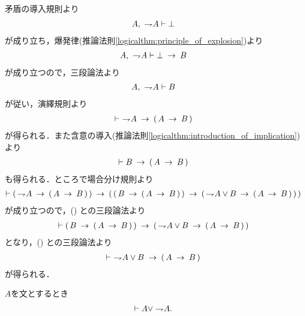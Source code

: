 	\begin{prf}
		矛盾の導入規則より
		\begin{align}
			A,\ \negation A \vdash \bot
		\end{align}
		が成り立ち，爆発律(推論法則\ref{logicalthm:principle_of_explosion})より
		\begin{align}
			A,\ \negation A \vdash \bot \rarrow B
		\end{align}
		が成り立つので，三段論法より
		\begin{align}
			A,\ \negation A \vdash B
		\end{align}
		が従い，演繹規則より
		\begin{align}
			\vdash\ \negation A \rarrow (\, A \rarrow B\, )
			\label{fom:disjunction_of_negation_rewritable_by_implication_1}
		\end{align}
		が得られる．また含意の導入(推論法則\ref{logicalthm:introduction_of_implication})より
		\begin{align}
			\vdash B \rarrow (\, A \rarrow B\, )
			\label{fom:disjunction_of_negation_rewritable_by_implication_2}
		\end{align}
		も得られる．ところで場合分け規則より
		\begin{align}
			\vdash (\, \negation A \rarrow (\, A \rarrow B\, )\, )
			\rarrow (\, (\, B \rarrow (\, A \rarrow B\, )\, )
			\rarrow (\, \negation A \vee B \rarrow (\, A \rarrow B\, )\, )\, )
		\end{align}
		が成り立つので，()
		との三段論法より
		\begin{align}
			\vdash (\, B \rarrow (\, A \rarrow B\, )\, )
			\rarrow (\, \negation A \vee B \rarrow (\, A \rarrow B\, )\, )
		\end{align}
		となり，()
		との三段論法より
		\begin{align}
			\vdash\ \negation A \vee B \rarrow (\, A \rarrow B\, )
		\end{align}
		が得られる．
		\QED
	\end{prf}
	
	\begin{screen}
		\begin{logicalthm}[排中律]\label{logicalthm:law_of_excluded_middle}
			$A$を文とするとき
			\begin{align}
				\vdash A \vee \negation A.
			\end{align}
		\end{logicalthm}
	\end{screen}
	
